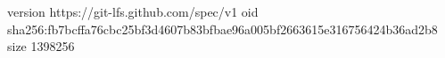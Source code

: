 version https://git-lfs.github.com/spec/v1
oid sha256:fb7bcffa76cbc25bf3d4607b83bfbae96a005bf2663615e316756424b36ad2b8
size 1398256
